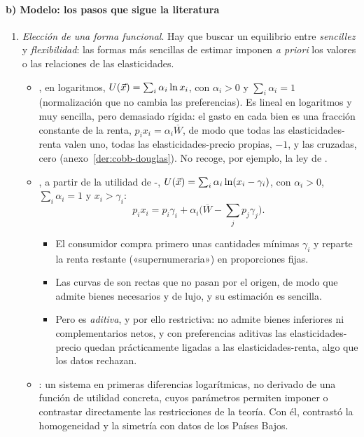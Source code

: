 \documentclass[11pt]{article}
\begin{document}
\paragraph{b) Modelo: los pasos que sigue la literatura}

\begin{enumerate}
\item \emph{Elección de una forma funcional}. Hay que buscar un equilibrio entre \emph{sencillez} y \emph{flexibilidad}: las formas más sencillas de estimar imponen \emph{a priori} los valores o las relaciones de las elasticidades.
  \begin{itemize}
  \item {}, en logaritmos, $U(\vec{x})=\sum_i\alpha_i\ln x_i$, con $\alpha_i>0$ y $\sum_i\alpha_i=1$ (normalización que no cambia las preferencias). Es lineal en logaritmos y muy sencilla, pero demasiado rígida: el gasto en cada bien es una fracción constante de la renta, $p_ix_i=\alpha_i\overline{W}$, de modo que todas las elasticidades-renta valen uno, todas las elasticidades-precio propias, $-1$, y las cruzadas, cero (anexo~\ref{der:cobb-douglas}). No recoge, por ejemplo, la ley de .
  \item {}, a partir de la utilidad de -, $U(\vec{x})=\sum_i\alpha_i\ln(x_i-\gamma_i)$, con $\alpha_i>0$, $\sum_i\alpha_i=1$ y $x_i>\gamma_i$\nocite{Geary1950Note,Stone1954Linear}:
    \begin{equation*}
    p_ix_i=p_i\gamma_i+\alpha_i\Big(\overline{W}-\sum_jp_j\gamma_j\Big).
    \end{equation*}
    \begin{itemize}
    \item El consumidor compra primero unas cantidades mínimas $\gamma_i$ y reparte la renta restante («supernumeraria») en proporciones fijas.
    \item Las curvas de  son rectas que no pasan por el origen, de modo que admite bienes necesarios y de lujo, y su estimación es sencilla.
    \item Pero es \emph{aditiva}, y por ello restrictiva: no admite bienes inferiores ni complementarios netos, y con preferencias aditivas las elasticidades-precio quedan prácticamente ligadas a las elasticidades-renta, algo que los datos rechazan\nocite{Deaton1974Analysis}.
    \end{itemize}
  \item {}\nocite{Theil1965Information,Barten1967Slutsky}: un sistema en primeras diferencias logarítmicas, no derivado de una función de utilidad concreta, cuyos parámetros permiten imponer o contrastar directamente las restricciones de la teoría. Con él, \textcite{Barten1967Slutsky,Barten1969Maximum} contrastó la homogeneidad y la simetría con datos de los Países Bajos.

\end{itemize}
\end{enumerate}
\end{document}
